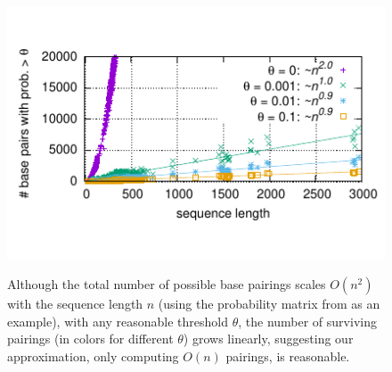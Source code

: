 \begin{figure}[t]
\vspace{-0.9cm}
\center
\includegraphics[width=.42\textwidth]{figs/Vienna_RNAfold_num_pij_curves.pdf}\\[-1cm]
\caption{
  Although the total number of possible base pairings scales $O(n^2)$ with the sequence length $n$
  (using the probability matrix from \viennarnafold as an example),
  with any reasonable threshold $\theta$, the number of surviving pairings (in colors for different $\theta$) grows linearly,
  suggesting our approximation, only computing $O(n)$ pairings, is reasonable.
  \label{fig:linearpairs}}
\vspace{-0.7cm}
\end{figure}
